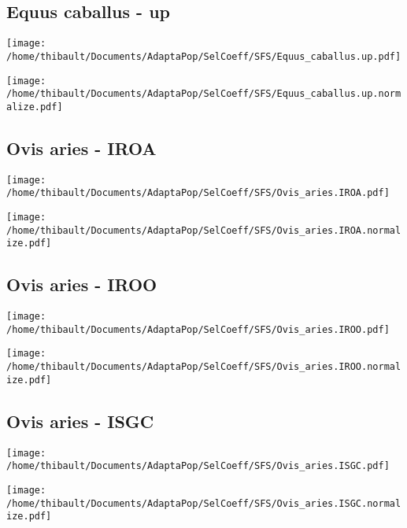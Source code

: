 \subsection{Equus caballus - up} 
 
\begin{minipage}{0.49\linewidth} 
\texttt{[image: /home/thibault/Documents/AdaptaPop/SelCoeff/SFS/Equus\_caballus.up.pdf]} 
\end{minipage}
\begin{minipage}{0.49\linewidth}
\texttt{[image: /home/thibault/Documents/AdaptaPop/SelCoeff/SFS/Equus\_caballus.up.normalize.pdf]} 
\end{minipage}
\subsection{Ovis aries - IROA} 
 
\begin{minipage}{0.49\linewidth} 
\texttt{[image: /home/thibault/Documents/AdaptaPop/SelCoeff/SFS/Ovis\_aries.IROA.pdf]} 
\end{minipage}
\begin{minipage}{0.49\linewidth}
\texttt{[image: /home/thibault/Documents/AdaptaPop/SelCoeff/SFS/Ovis\_aries.IROA.normalize.pdf]} 
\end{minipage}
\subsection{Ovis aries - IROO} 
 
\begin{minipage}{0.49\linewidth} 
\texttt{[image: /home/thibault/Documents/AdaptaPop/SelCoeff/SFS/Ovis\_aries.IROO.pdf]} 
\end{minipage}
\begin{minipage}{0.49\linewidth}
\texttt{[image: /home/thibault/Documents/AdaptaPop/SelCoeff/SFS/Ovis\_aries.IROO.normalize.pdf]} 
\end{minipage}
\subsection{Ovis aries - ISGC} 
 
\begin{minipage}{0.49\linewidth} 
\texttt{[image: /home/thibault/Documents/AdaptaPop/SelCoeff/SFS/Ovis\_aries.ISGC.pdf]} 
\end{minipage}
\begin{minipage}{0.49\linewidth}
\texttt{[image: /home/thibault/Documents/AdaptaPop/SelCoeff/SFS/Ovis\_aries.ISGC.normalize.pdf]} 
\end{minipage}
